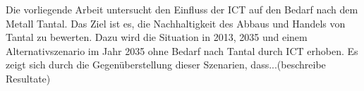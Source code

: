 Die vorliegende Arbeit untersucht den Einfluss der ICT auf den Bedarf nach dem Metall Tantal. Das Ziel ist es, die Nachhaltigkeit des Abbaus und Handels von Tantal zu bewerten.
Dazu wird die Situation in 2013, 2035 und einem Alternativszenario im Jahr 2035 ohne Bedarf nach Tantal durch ICT erhoben.
Es zeigt sich durch die Gegenüberstellung dieser Szenarien, dass...(beschreibe Resultate)
